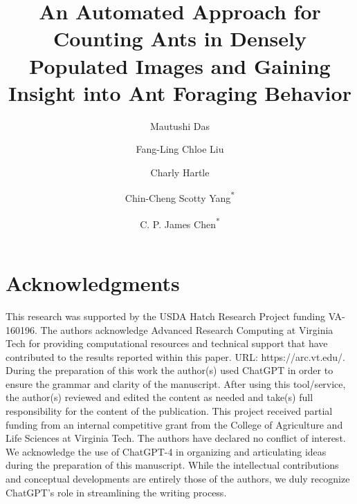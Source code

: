 \documentclass{article}
\title{An Automated Approach for Counting Ants in Densely Populated Images and Gaining Insight into Ant Foraging Behavior }
\author[1]{Mautushi Das}
\author[2]{Fang-Ling Chloe Liu}
\author[2]{Charly Hartle}
\author[2]{Chin-Cheng Scotty Yang\textsuperscript{*}}
\author[1]{C. P. James Chen\textsuperscript{*}}
\affil[1]{School of Animal Sciences, Virginia Tech, Blacksburg, VA 24061, USA}
\affil[2]{Department of Entomology, Virginia Tech, Blacksburg, VA 24061, USA}
\begin{document}
\maketitle









\section*{Acknowledgments}

This research was supported by the USDA Hatch Research Project funding VA-160196. The authors acknowledge Advanced Research Computing at Virginia Tech for providing computational resources and technical support that have contributed to the results reported within this paper. URL: https://arc.vt.edu/. During the preparation of this work the author(s) used ChatGPT in order to ensure the grammar and clarity of the manuscript. After using this tool/service, the author(s) reviewed and edited the content as needed and take(s) full responsibility for the content of the publication.
This project received partial funding from an internal competitive grant from the College of Agriculture and Life Sciences at Virginia Tech. The authors have declared no conflict of interest. We acknowledge the use of ChatGPT-4 in organizing and articulating ideas during the preparation of this manuscript. While the intellectual contributions and conceptual developments are entirely those of the authors, we duly recognize ChatGPT’s role in streamlining the writing process.

\newpage





\newpage
\end{document}
